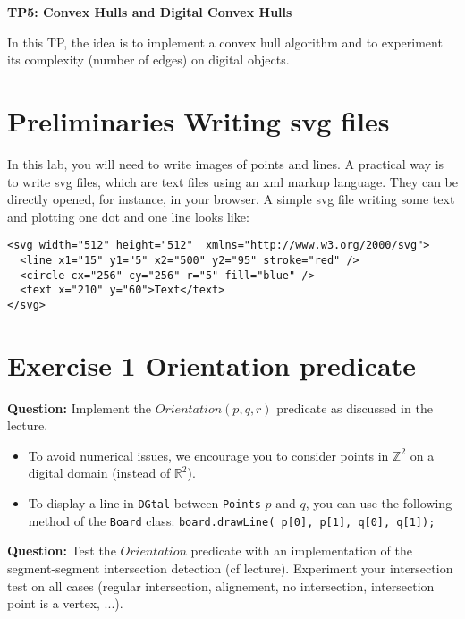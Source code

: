 \documentclass[a4paper, 11pt]{article}
\title{}
\author{}
\date{}
\begin{document}
\begin{center}
	\LARGE \textbf{TP5: Convex Hulls and Digital Convex Hulls}
\end{center}

\bigskip
\par In this TP, the idea is to implement a convex hull algorithm and to experiment its complexity (number of edges) on digital objects.


\section*{Preliminaries \rm Writing svg files}

In this lab, you will need to write images of points and lines. A practical way is to write svg files, which are text files using an xml markup language. They can be directly opened, for instance, in your browser. A simple svg file writing some text and plotting one dot and one line looks like:

\begin{verbatim} 
<svg width="512" height="512"  xmlns="http://www.w3.org/2000/svg">
  <line x1="15" y1="5" x2="500" y2="95" stroke="red" />
  <circle cx="256" cy="256" r="5" fill="blue" />
  <text x="210" y="60">Text</text>
</svg>
\end{verbatim} 
\section*{Exercise 1 \rm Orientation predicate}

{\bf Question:} Implement the $Orientation(p,q,r)$ predicate as discussed in the lecture.
	\begin{itemize}
	\item To avoid numerical issues, we encourage you to consider points in $\mathbb{Z}^2$ on a digital domain (instead of $\mathbb{R}^2$). 
	\item To display a line in \texttt{DGtal} between \texttt{Points} $p$ and $q$, you can use the following method of the \texttt{Board} class: \texttt{board.drawLine( p[0], p[1], q[0], q[1]);}
	\end{itemize}

{\bf Question:} Test the $Orientation$ predicate with an implementation of the segment-segment intersection detection (cf lecture). Experiment your intersection test on all cases (regular intersection, alignement, no intersection, intersection point is a vertex, ...).
\end{document}

